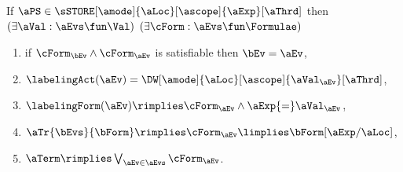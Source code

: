 If $\aPS \in \sSTORE[\amode]{\aLoc}[\ascope]{\aExp}[\aThrd]$ then
$(\exists\aVal:\aEvs\fun\Val)$
$(\exists\cForm:\aEvs\fun\Formulae)$
\begin{multicols}{2}
  \begin{enumerate}[topsep=0pt,label=(\textsc{w}\arabic*),ref=\textsc{w}\arabic*]
  \item \label{write-E-x}
    if $\cForm_\bEv\land\cForm_\aEv$ is satisfiable then $\bEv=\aEv$,
  \item \label{write-lambda-x}
    $\labelingAct(\aEv) = \DW[\amode]{\aLoc}[\ascope]{\aVal_\aEv}[\aThrd]$,
  \item \label{write-kappa-x}
    \begin{math}
      \labelingForm(\aEv) \rimplies
      \cForm_\aEv
      \land \aExp{=}\aVal_\aEv
    \end{math},
    
    
  \item \label{write-tau-x}
    \begin{math}
      \aTr{\bEvs}{\bForm} \rimplies 
      \cForm_\aEv
      \limplies 
      \bForm[\aExp/\aLoc]
    \end{math},
  \item \label{write-term-x}
    $\aTerm \rimplies \bigvee_{\aEv\in\aEvs}\cForm_\aEv$.
  \end{enumerate}
\end{multicols}

